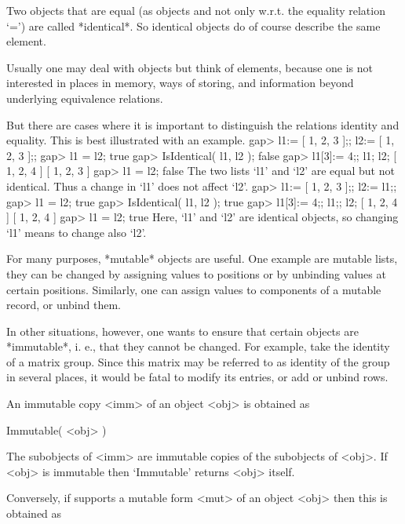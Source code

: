 
Two objects that are equal (as objects and not only w.r.t. the equality
relation `=') are called *identical*.
So identical objects do of course describe the same element.

Usually one may deal with objects but think of elements,
because one is not interested in places in memory, ways of storing,
and information beyond underlying equivalence relations.

But there are cases where it is important to distinguish the relations
identity and equality.
This is best illustrated with an example.
\beginexample
    gap> l1:= [ 1, 2, 3 ];; l2:= [ 1, 2, 3 ];;
    gap> l1 = l2;
    true
    gap> IsIdentical( l1, l2 );
    false
    gap> l1[3]:= 4;; l1; l2;
    [ 1, 2, 4 ]
    [ 1, 2, 3 ]
    gap> l1 = l2;
    false
\endexample
The two lists `l1' and `l2' are equal but not identical.
Thus a change in `l1' does not affect `l2'.
\beginexample
    gap> l1:= [ 1, 2, 3 ];; l2:= l1;;
    gap> l1 = l2;
    true
    gap> IsIdentical( l1, l2 );
    true
    gap> l1[3]:= 4;; l1;; l2;
    [ 1, 2, 4 ]
    [ 1, 2, 4 ]
    gap> l1 = l2;
    true
\endexample
Here, `l1' and `l2' are identical objects,
so changing `l1' means to change also `l2'.


For many purposes, *mutable* objects are useful.
One example are mutable lists,
they can be changed by assigning values to positions
or by unbinding values at certain positions.
Similarly, one can assign values to components of a mutable record,
or unbind them.

In other situations, however,
one wants to ensure that certain objects are *immutable*,
i. e., that they cannot be changed.
For example, take the identity of a matrix group.
Since this matrix may be referred to as identity of the group in several
places, it would be fatal to modify its entries, or add or unbind rows.

An immutable copy <imm> of an object <obj> is obtained as

\>Immutable( <obj> )

The subobjects of <imm> are immutable copies of the subobjects of <obj>.
If <obj> is immutable then `Immutable' returns <obj> itself.

Conversely, if {\GAP} supports a mutable form <mut> of an object <obj>
then this is obtained as

